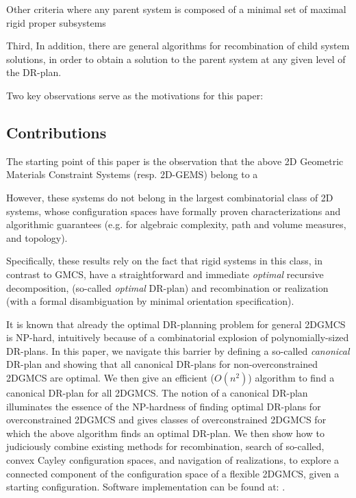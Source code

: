 Other criteria where any parent system is composed of  
a minimal set of maximal rigid proper subsystems  



Third, In addition, there are general algorithms for
recombination of  child system solutions, in order to obtain a solution to the parent system at any
given level of the DR-plan.


 Two key observations serve as the motivations for this paper:


\subsection{Contributions}

The starting point of this paper is the observation that the above 2D Geometric Materials Constraint Systems (resp. 2D-GEMS) 
belong to a  

However, these systems do not 
belong in the largest combinatorial class of 2D systems, whose configuration spaces have formally proven  characterizations and 
algorithmic guarantees (e.g. for algebraic complexity, path and volume measures, and  topology).

Specifically, these results  rely on the fact that rigid systems in this  class, in contrast to GMCS, 
have a straightforward and immediate {\sl optimal} recursive decomposition, (so-called {\sl optimal} DR-plan) and  recombination 
or realization (with a formal disambiguation by minimal orientation specification).

It is known  that already the optimal DR-planning problem for general 2DGMCS is NP-hard, intuitively 
because of a combinatorial explosion of polynomially-sized DR-plans.  In this paper, we  navigate this barrier by defining a 
so-called {\it canonical} DR-plan and showing that all canonical DR-plans for non-overconstrained 2DGMCS are optimal. 
We then give an efficient ($O(n^2)$) algorithm to find a canonical DR-plan for all 2DGMCS. The notion of a canonical DR-plan 
illuminates the essence of the NP-hardness of finding optimal DR-plans for overconstrained 2DGMCS and gives classes of 
overconstrained 2DGMCS for which the above  algorithm finds an optimal DR-plan. We then show how to judiciously combine 
existing methods for recombination, search of so-called, convex Cayley configuration spaces, and navigation of realizations, 
to explore a connected component of the configuration space of a flexible 2DGMCS, given a starting configuration. 
Software implementation can be found at: .


